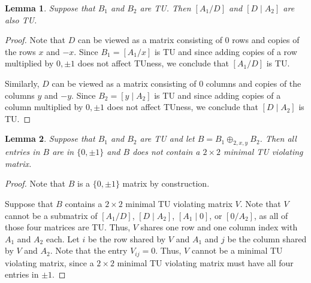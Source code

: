 \documentclass{article}
\newtheorem{lemma}{Lemma}
\theoremstyle{definition}
\begin{document}
\begin{lemma}\label{lem:two_sum_two_blocks_tu}
    Suppose that $B_{1}$ and $B_{2}$ are TU. Then $\left[A_{1} / D\right]$ and $\left[D \mid A_{2}\right]$ are also TU.
\end{lemma}

\begin{proof}
    Note that $D$ can be viewed as a matrix consisting of $0$ rows and copies of the rows $x$ and $-x$. Since $B_{1} = \left[A_{1} / x\right]$ is TU and since adding copies of a row multiplied by ${0, \pm 1}$ does not affect TUness, we conclude that $\left[A_{1} / D\right]$ is TU.

    Similarly, $D$ can be viewed as a matrix consisting of $0$ columns and copies of the columns $y$ and $-y$. Since $B_{2} = \left[y \mid A_{2}\right]$ is TU and since adding copies of a column multiplied by ${0, \pm 1}$ does not affect TUness, we conclude that $\left[D \mid A_{2}\right]$ is TU.
\end{proof}

\begin{lemma}\label{lem:two_sum_reg_mvm_12}
    Suppose that $B_{1}$ and $B_{2}$ are TU and let $B = B_{1} \oplus_{2, x, y} B_{2}$. Then all entries in $B$ are in $\{0, \pm 1\}$ and $B$ does not contain a $2 \times 2$ minimal TU violating matrix.
\end{lemma}

\begin{proof}
    Note that $B$ is a $\{0, \pm 1\}$ matrix by construction.

    Suppose that $B$ contains a $2 \times 2$ minimal TU violating matrix $V$. Note that $V$ cannot be a submatrix of $\left[A_{1} / D\right]$, $\left[D \mid A_{2}\right]$, $\left[A_{1} \mid 0\right]$, or $\left[0 / A_{2}\right]$, as all of those four matrices are TU. Thus, $V$ shares one row and one column index with $A_{1}$ and $A_{2}$ each. Let $i$ be the row shared by $V$ and $A_{1}$ and $j$ be the column shared by $V$ and $A_{2}$. Note that the entry $V_{ij} = 0$. Thus, $V$ cannot be a minimal TU violating matrix, since a $2 \times 2$ minimal TU violating matrix must have all four entries in $\pm 1$.
\end{proof}
\end{document}
